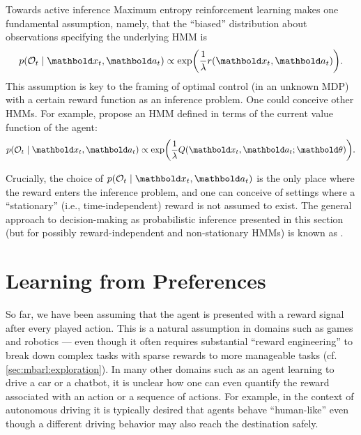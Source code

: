 \begin{rmk}{Towards active inference}{}
  Maximum entropy reinforcement learning makes one fundamental assumption, namely, that the ``biased'' distribution about observations specifying the underlying HMM is \begin{align*}
    p(\spO_t \mid \vx_t, \va_t) \propto \exp\parentheses*{\frac{1}{\lambda} r(\vx_t, \va_t)}.
  \end{align*}
  This assumption is key to the framing of optimal control (in an unknown MDP) with a certain reward function as an inference problem.
  One could conceive other HMMs.
  For example, \cite{fellows2019virel} propose an HMM defined in terms of the current value function of the agent: \begin{align*}
    p(\spO_t \mid \vx_t, \va_t) \propto \exp\parentheses*{\frac{1}{\lambda} \Q{\vx_t}{\va_t; \vtheta}}.
  \end{align*}

  Crucially, the choice of $p(\spO_t \mid \vx_t, \va_t)$ is the only place where the reward enters the inference problem, and one can conceive of settings where a ``stationary'' (i.e., time-independent) reward is not assumed to exist.
  The general approach to decision-making as probabilistic inference presented in this section (but for possibly reward-independent and non-stationary HMMs) is known as  \citep{friston2015active,millidge2020relationship,millidge2021whence,parr2022active}.
\end{rmk}

\section{Learning from Preferences}\label{sec:mfarl:preference_learning}

So far, we have been assuming that the agent is presented with a reward signal after every played action.
This is a natural assumption in domains such as games and robotics --- even though it often requires substantial ``reward engineering'' to break down complex tasks with sparse rewards to more manageable tasks (cf. \cref{sec:mbarl:exploration}).
In many other domains such as an agent learning to drive a car or a chatbot, it is unclear how one can even quantify the reward associated with an action or a sequence of actions.
For example, in the context of autonomous driving it is typically desired that agents behave ``human-like'' even though a different driving behavior may also reach the destination safely.

